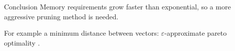 \documentclass{beamer}
\begin{document}
\begin{frame}{Conclusion}
	Memory requirements grow faster than exponential, so a more aggressive
	pruning method is needed.

	For example a minimum distance between vectors: $\varepsilon$-approximate
	pareto optimality \cite{barrett2008learning}.
\end{frame}

\begin{frame}
	
	
\end{frame}
\end{document}
